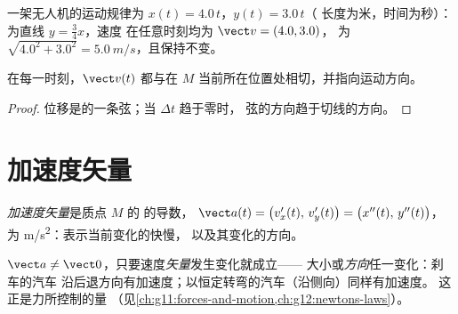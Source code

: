 \begin{example}[无人机的水平飞行]\label{ex:g12:kinematics-2d:drone}
一架无人机的运动规律为 $x(t) = 4.0\,t$，$y(t) = 3.0\,t$（
长度为米，时间为秒）：为直线 $y = \tfrac34 x$，速度
在任意时刻均为 $\vect v = (4.0, 3.0)$，
为 $\sqrt{4.0^2 + 3.0^2} = \qty{5.0}{m/s}$，且保持不变。
\end{example}

\begin{proposition}[速度与轨迹相切]\label{prop:g12:kinematics-2d:tangent}
在每一时刻，$\vect v(t)$ 都与在
$M$ 当前所在位置处相切，并指向运动方向。
\end{proposition}

\begin{proof}
位移是的一条弦；当 $\Delta t$ 趋于零时，
弦的方向趋于切线的方向。
\end{proof}

\section{加速度矢量}

\begin{definition}[加速度矢量]\label{def:g12:kinematics-2d:acceleration}
\emph{加速度矢量}是质点 $M$ 的
的导数，
$\vect a(t) = \bigl(v_x'(t),\, v_y'(t)\bigr) =
\bigl(x''(t),\, y''(t)\bigr)$，为 \unit{m/s^2}：表示当前变化的快慢，
以及其变化的方向。
\end{definition}

\begin{remark}[加速而速率不变]\label{rem:g12:kinematics-2d:turning}
$\vect a \neq \vect 0$，只要速度\emph{矢量}发生变化就成立——
大小或\emph{方向}任一变化：刹车的汽车
沿后退方向有加速度；以恒定转弯的汽车（沿侧向）同样有加速度。
这正是力所控制的量
（见\cref{ch:g11:forces-and-motion,ch:g12:newtons-laws}）。
\end{remark}

